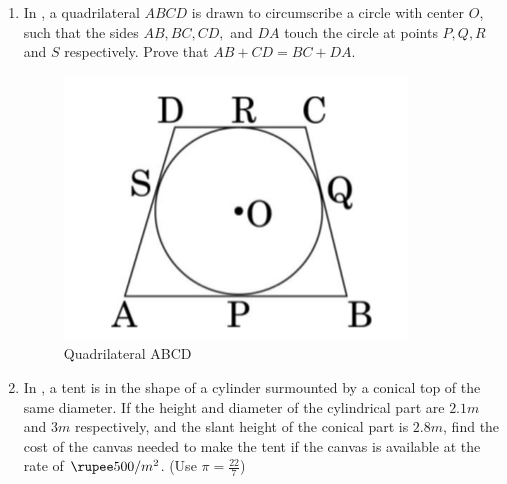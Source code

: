 \documentclass{article}                                         %
\begin{document}
                                                                                                                \begin{enumerate}
\item In , a quadrilateral $ABCD$ is drawn to circumscribe a circle with center $O$, such that the sides $AB, BC, CD,$ and $DA$ touch the circle at points $P, Q, R$ and $S$ respectively. Prove that $AB + CD = BC + DA$.
    \begin{figure}[H]
        \includegraphics[width=\columnwidth]{./quadrilateralABCD.jpg}
        \caption{Quadrilateral ABCD}
        \label{fig:quadrilateralABCD}
    \end{figure}
\item In , a tent is in the shape of a cylinder surmounted by a conical top of the same diameter. If the height and diameter of the cylindrical part are $2.1 m$ and $3 m$ respectively, and the slant height of the conical part is $2.8 m$, find the cost of the canvas needed to make the tent if the canvas is available at the rate of $\rupee 500/ m^2$. (Use $\pi = \frac{22}{7}$)
    \begin{figure}[H]

\end{figure}
\end{enumerate}
\end{document}
